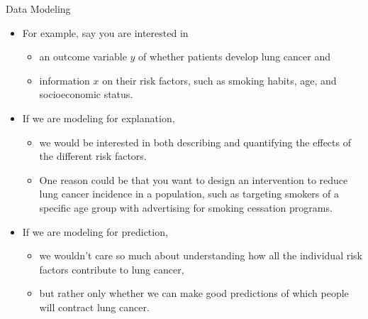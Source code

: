 \documentclass[
  ignorenonframetext,
]{beamer}
\providecommand{\tightlist}{%
  \setlength{\itemsep}{0pt}\setlength{\parskip}{0pt}}
\begin{document}
\begin{frame}{Data Modeling}
\label{data-modeling-1}
\begin{itemize}
\item
  For example, say you are interested in

  \begin{itemize}
  \tightlist
  \item
    an outcome variable \(y\) of whether patients develop lung cancer
    and
  \item
    information \(x\) on their risk factors, such as smoking habits,
    age, and socioeconomic status.
  \end{itemize}
\item
  If we are modeling for explanation,

  \begin{itemize}
  \tightlist
  \item
    we would be interested in both describing and quantifying the
    effects of the different risk factors.
  \item
    One reason could be that you want to design an intervention to
    reduce lung cancer incidence in a population, such as targeting
    smokers of a specific age group with advertising for smoking
    cessation programs.
  \end{itemize}
\item
  If we are modeling for prediction,

  \begin{itemize}
  \tightlist
  \item
    we wouldn't care so much about understanding how all the individual
    risk factors contribute to lung cancer,
  \item
    but rather only whether we can make good predictions of which people
    will contract lung cancer.
  \end{itemize}
\end{itemize}
\end{frame}
\end{document}

